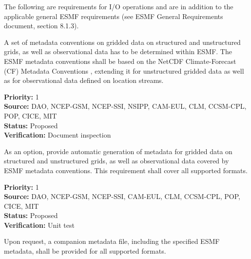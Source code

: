 

The following are requirements for I/O operations and are in addition
to the applicable general ESMF requirements (see ESMF General 
Requirements document, section 8.1.3).



A set of metadata conventions on gridded data on structured and
unstructured grids, as well as observational data has to be determined
within ESMF. The ESMF metadata conventions shall be based on the
NetCDF Climate-Forecast (CF) Metadata Conventions
\cite{NetCDF_CF}, extending it for unstructured gridded data
as well as for observational data defined on location streams.

\begin{reqlist}
{\bf Priority:} 1 \\
{\bf Source:} DAO, NCEP-GSM, NCEP-SSI, NSIPP, CAM-EUL, CLM, CCSM-CPL, POP, CICE, MIT \\
{\bf Status:} Proposed \\
{\bf Verification:} Document inspection \\
\end{reqlist}


As an option, provide automatic generation of metadata for gridded
data on structured and unstructured grids, as well as observational
data covered by ESMF metadata conventions. This requirement shall
cover all supported formats.

\begin{reqlist}
{\bf Priority:} 1 \\
{\bf Source:} DAO, NCEP-GSM, NCEP-SSI, CAM-EUL, CLM, CCSM-CPL, POP, CICE, MIT \\
{\bf Status:} Proposed \\
{\bf Verification:} Unit test \\
\end{reqlist}



Upon request, a companion metadata file, including the specified ESMF
metadata, shall be provided for all supported formats.

